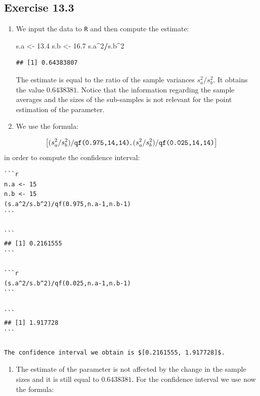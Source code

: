\documentclass[]{krantz}
\makeatletter
\newenvironment{Shaded}{\begin{snugshade}}{\end{snugshade}}
\newcommand{\DecValTok}[1]{\textcolor[rgb]{0.00,0.00,0.81}{#1}}
\newcommand{\FloatTok}[1]{\textcolor[rgb]{0.00,0.00,0.81}{#1}}
\newcommand{\StringTok}[1]{\textcolor[rgb]{0.31,0.60,0.02}{#1}}
\newcommand{\OperatorTok}[1]{\textcolor[rgb]{0.81,0.36,0.00}{\textbf{#1}}}
\newcommand{\NormalTok}[1]{#1}
\providecommand{\tightlist}{%
  \setlength{\itemsep}{0pt}\setlength{\parskip}{0pt}}
\newenvironment{kframe}{%
\medskip{}
\setlength{\fboxsep}{.8em}
 \def\at@end@of@kframe{}%
 \ifinner\ifhmode%
  \def\at@end@of@kframe{\end{minipage}}%
  \begin{minipage}{\columnwidth}%
 \fi\fi%
 \def\FrameCommand##1{\hskip\@totalleftmargin \hskip-\fboxsep
 \colorbox{shadecolor}{##1}\hskip-\fboxsep
     \hskip-\linewidth \hskip-\@totalleftmargin \hskip\columnwidth}%
 \MakeFramed {\advance\hsize-\width
   \@totalleftmargin\z@ \linewidth\hsize
   \@setminipage}}%
 {\par\unskip\endMakeFramed%
 \at@end@of@kframe}
\renewenvironment{Shaded}{\begin{kframe}}{\end{kframe}}
\theoremstyle{definition}
\theoremstyle{definition}
\theoremstyle{definition}
\theoremstyle{remark}
\makeatother
\begin{document}
\subsection*{Exercise 13.3}\label{exercise-13.3}


\begin{enumerate}
\def\labelenumi{\arabic{enumi}.}
\item
  We input the data to \texttt{R} and then compute the estimate:

\begin{Shaded}
\begin{Highlighting}[]
\NormalTok{s.a <-}\StringTok{ }\FloatTok{13.4}
\NormalTok{s.b <-}\StringTok{ }\FloatTok{16.7}
\NormalTok{s.a}\OperatorTok{^}\DecValTok{2}\OperatorTok{/}\NormalTok{s.b}\OperatorTok{^}\DecValTok{2}
\end{Highlighting}
\end{Shaded}

\begin{verbatim}
## [1] 0.64383807
\end{verbatim}

  The estimate is equal to the ratio of the sample variances
  \(s_a^2/s_b^2\). It obtains the value \(0.6438381\). Notice that the
  information regarding the sample averages and the sizes of the
  sub-samples is not relevant for the point estimation of the parameter.
\item
  We use the formula:
\end{enumerate}

\[\big[(s_a^2/s_b^2)/\mbox{\texttt{qf(0.975,14,14)}} , (s_a^2/s_b^2)/\mbox{\texttt{qf(0.025,14,14)}}\big]\]
in order to compute the confidence interval:

\begin{verbatim}
```r
n.a <- 15
n.b <- 15
(s.a^2/s.b^2)/qf(0.975,n.a-1,n.b-1)
```

```
## [1] 0.2161555
```

```r
(s.a^2/s.b^2)/qf(0.025,n.a-1,n.b-1)
```

```
## [1] 1.917728
```

The confidence interval we obtain is $[0.2161555, 1.917728]$.
\end{verbatim}

\begin{enumerate}
\def\labelenumi{\arabic{enumi}.}
\setcounter{enumi}{2}
\tightlist
\item
  The estimate of the parameter is not affected by the change in the
  sample sizes and it is still equal to \(0.6438381\). For the
  confidence interval we use now the formula:
\end{enumerate}
\end{document}
